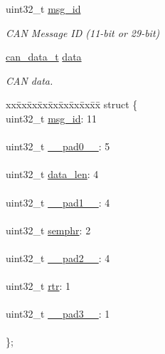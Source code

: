\begin{DoxyCompactItemize}
\begin{tabbing}
\end{tabbing}\item 
uint32\+\_\+t \hyperlink{struct____attribute_____a676a49f79047392e2bac357a55bb74ed}{msg\+\_\+id}
\begin{DoxyCompactList}\small\item\em C\+AN Message ID (11-\/bit or 29-\/bit) \end{DoxyCompactList}\item 
\hyperlink{unioncan__data__t}{can\+\_\+data\+\_\+t} \hyperlink{struct____attribute_____a671d4cb674b1287a89ab3dd93d8d36e2}{data}
\begin{DoxyCompactList}\small\item\em C\+AN data. \end{DoxyCompactList}\item 
\begin{tabbing}
xx\=xx\=xx\=xx\=xx\=xx\=xx\=xx\=xx\=\kill
struct \{\\
\>uint32\_t \hyperlink{struct____attribute_____a676a49f79047392e2bac357a55bb74ed}{msg\_id}: 11\\
\>\\
\>uint32\_t \hyperlink{struct____attribute_____a02ee404618bb2bb7a588a4ad5927894d}{\_\_pad0\_\_}: 5\\
\>\\
\>uint32\_t \hyperlink{struct____attribute_____ae6f628b8af2722362b91666d5cff6041}{data\_len}: 4\\
\>\\
\>uint32\_t \hyperlink{struct____attribute_____a0c4e6e1eb99bec0a27a70420f40ac211}{\_\_pad1\_\_}: 4\\
\>\\
\>uint32\_t \hyperlink{struct____attribute_____a093c08572a86d14158d4ad2b8d526557}{semphr}: 2\\
\>\\
\>uint32\_t \hyperlink{struct____attribute_____a2d8f39dfa819e39b227d2790c26409d2}{\_\_pad2\_\_}: 4\\
\>\\
\>uint32\_t \hyperlink{struct____attribute_____aee214ea38d7e1f8c3dc6e84f3993fdec}{rtr}: 1\\
\>\\
\>uint32\_t \hyperlink{struct____attribute_____a898a0c6c6d94ece9275b1379d2d24f60}{\_\_pad3\_\_}: 1\\
\>\\
\}; \\


\end{tabbing}
\end{DoxyCompactItemize}
